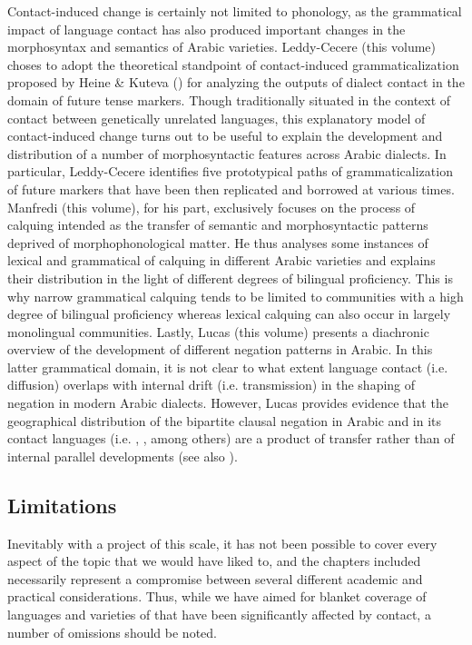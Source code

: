 \documentclass[output=paper]{langsci/langscibook}
\begin{document}
Contact-induced change is certainly not limited to phonology, as the grammatical impact of language contact has also produced important changes in the morphosyntax and semantics of Arabic varieties. Leddy-Cecere (this volume) choses to adopt the theoretical standpoint of contact-induced grammaticalization proposed by Heine \& Kuteva (\citeyear{HeineKuteva2003,HeineKuteva2005}) for analyzing the outputs of dialect contact in the domain of future tense markers. Though traditionally situated in the context of contact between genetically unrelated languages, this explanatory model of contact-induced change turns out to be useful to explain the development and distribution of a number of morphosyntactic features across Arabic dialects. In particular, Leddy-Cecere identifies five prototypical paths of grammaticalization of future markers that have been then replicated and borrowed at various times. Manfredi (this volume), for his part, exclusively focuses on the process of calquing intended as the transfer of semantic and morphosyntactic patterns deprived of morphophonological matter. He thus analyses some instances of lexical and grammatical of calquing in different Arabic varieties and explains their distribution in the light of different degrees of bilingual proficiency. This is why narrow grammatical calquing tends to be limited to communities with a high degree of bilingual proficiency whereas lexical calquing can also occur in largely monolingual communities. Lastly, Lucas (this volume) presents a diachronic overview of the development of different negation patterns in Arabic. In this latter grammatical domain, it is not clear to what extent language contact (i.e. diffusion) overlaps with internal drift (i.e. transmission) in the shaping of negation in modern Arabic dialects. However, Lucas provides evidence that the geographical distribution of the bipartite clausal negation in Arabic and in its contact languages (i.e. , ,  among others) are a product of transfer rather than of internal parallel developments (see also \citealt{LucasLash2010}). 


\subsection{Limitations}\label{introlimitations}


Inevitably with a project of this scale, it has not been possible to cover every  aspect of the topic that we would have liked to, and the chapters included necessarily represent a compromise between several different academic and practical considerations. Thus, while we have aimed for blanket coverage of languages and varieties of  that have been significantly affected by contact, a number of omissions should be noted.
\end{document}
